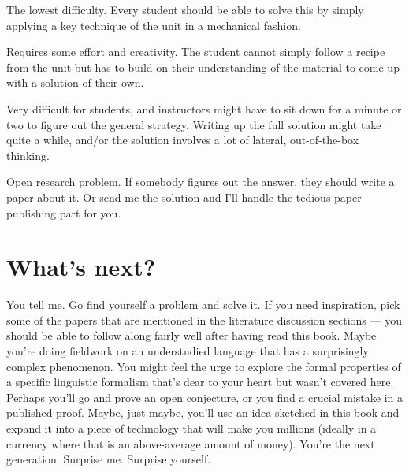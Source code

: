 \begin{homework}
    The lowest difficulty.
    Every student should be able to solve this by simply applying a key technique of the unit in a mechanical fashion.
\end{homework}

\begin{homework}[*]
    Requires some effort and creativity.
    The student cannot simply follow a recipe from the unit but has to build on their understanding of the material to come up with a solution of their own.
\end{homework}

\begin{homework}[**]
    Very difficult for students, and instructors might have to sit down for a minute or two to figure out the general strategy.
    Writing up the full solution might take quite a while, and\slash or the solution involves a lot of lateral, out-of-the-box thinking.
\end{homework}

\begin{homework}[***]
    Open research problem.
    If somebody figures out the answer, they should write a paper about it.
    Or send me the solution and I'll handle the tedious paper publishing part for you.
\end{homework}


\section*{What's next?}

You tell me.
Go find yourself a problem and solve it.
If you need inspiration, pick some of the papers that are mentioned in the literature discussion sections --- you should be able to follow along fairly well after having read this book. 
Maybe you're doing fieldwork on an understudied language that has a surprisingly complex phenomenon.
You might feel the urge to explore the formal properties of a specific linguistic formalism that's dear to your heart but wasn't covered here.
Perhaps you'll go and prove an open conjecture, or you find a crucial mistake in a published proof.
Maybe, just maybe, you'll use an idea sketched in this book and expand it into a piece of technology that will make you millions (ideally in a currency where that is an above-average amount of money).
You're the next generation.
Surprise me.
Surprise yourself.
